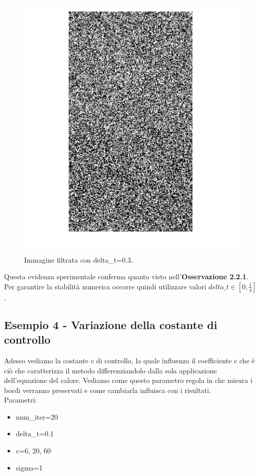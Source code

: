 \begin{figure}[htb] \centering
\includegraphics[scale=0.15]{Pictures/Esempi di utilizzo/Esempio 3/SfondoForesta_filtrata_deltat0_3.png}
\caption{Immagine filtrata con delta\_t=0.3.}\label{fig:figura}
\end{figure}
Questa evidenza sperimentale conferma quanto visto nell'\textbf{Osservazione 2.2.1}. Per garantire la stabilità numerica occorre quindi utilizzare valori $delta\_t \in [0,\frac{1}{4}]$.

\newpage
\subsection{Esempio 4 - Variazione della costante di controllo}
Adesso vediamo la costante c di controllo, la quale influenza il coefficiente c che è ciò che caratterizza il metodo differenziandolo dalla sola applicazione dell'equazione del calore. Vediamo come questo parametro regola in che misura i bordi verranno preservati e come cambiarla influisca con i risultati.\\
Parametri:
\begin{itemize}
    \item num\_iter=20
    \item delta\_t=0.1
    \item c=6, 20, 60
    \item sigma=1
\end{itemize}

